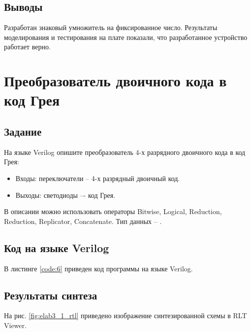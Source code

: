 \subsection{Выводы}

Разработан знаковый умножитель на фиксированное число. Результаты моделирования и тестирования на плате показали, что разработанное устройство работает верно.

\newpage

\graphicspath{{../lab3/pics/}}

\section{Преобразователь двоичного кода в код Грея}

\subsection{Задание}

На языке Verilog опишите преобразователь 4-х разрядного двоичного кода в код Грея:
\begin{itemize}
	\item Входы: переключатели  -- 4-х разрядный двоичный код.
	\item Выходы: светодиоды  –- код Грея.
\end{itemize}

В описании можно использовать операторы Bitwise, Logical, Reduction, Reduction, Replicator, Concatenate. Тип данных -- .

\subsection{Код на языке Verilog}

В листинге \ref{code:6} приведен код программы на языке Verilog.



\subsection{Результаты синтеза}

На рис. \ref{fig:elab3_1_rtl} приведено изображение синтезированной схемы в RLT Viewer.


